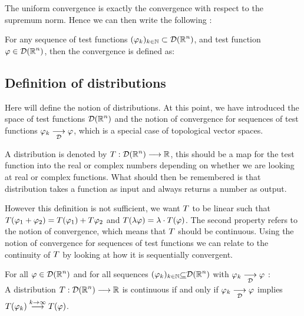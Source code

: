 \documentclass[11pt, openright]{book}
\begin{document}
The uniform convergence is exactly the convergence with respect to the supremum norm. Hence we can then write the following :
\begin{theorem}
    For any sequence of test functions $\displaystyle{(\varphi_k)_{k \in  \mathbb{N}}\subset \mathcal{D}(\mathbb{R}^n)}$, and test function $\displaystyle{\varphi \in \mathcal{D}(\mathbb{R}^n)}$, then the convergence is defined as:
\end{theorem}

\subsection{Definition of distributions}

Here will define the notion of distributions. At this point, we have introduced the space of test functions $\displaystyle{\mathcal{D}(\mathbb{R}^n)}$ and the notion of convergence for sequences of test functions $\displaystyle{\varphi_k \underset{\mathcal{D}}{\longrightarrow} \varphi}$, which is a special case of topological vector spaces.

A distribution is denoted by $\displaystyle{T:\mathcal{D}(\mathbb{R}^n)\longrightarrow\mathbb{R}}$, this should be a map for the test function into the real or complex numbers depending on whether we are looking at real or complex functions. What should then be remembered is that distribution takes a function as input and always returns a number as output.

However this definition is not sufficient, we want $\displaystyle{T}$ to be linear  such that $\displaystyle{T(\varphi_1+\varphi_2)=T(\varphi_1)+T\varphi_2}$ and $\displaystyle{T(\lambda\varphi)=\lambda\cdot T(\varphi)}$. The second property refers to the notion of convergence, which means that $\displaystyle{T}$ should be continuous. Using the notion of convergence for sequences of test functions we can relate to the continuity of $\displaystyle{T}$ by looking at how it is sequentially convergent.


\begin{theorem}
    For all $\displaystyle{\varphi\in \mathcal{D}(\mathbb{R}^n)}$ and for all sequences $\displaystyle{(\varphi_k)_{k\in \mathbb{N}}\underline{\subset }\mathcal{D}(\mathbb{R}^n)}$ with $\displaystyle{\varphi_k\underset{\mathcal{D}}{\longrightarrow}\varphi}$ :\\
    A distribution $\displaystyle{T:\mathcal{D}(\mathbb{R}^n)\longrightarrow\mathbb{R}}$ is continuous if and only if $\displaystyle{\varphi_k \underset{\mathcal{D}}{\longrightarrow} \varphi}$ implies $\displaystyle{T(\varphi_k) \overset{k\to \infty}{\longrightarrow} T(\varphi)}$.
\end{theorem}
\end{document}
